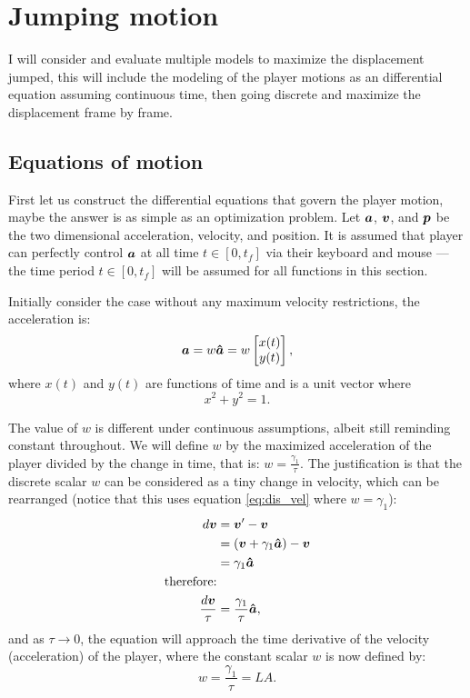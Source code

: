 \section{Jumping motion}
I will consider and evaluate multiple models to maximize the displacement jumped, this will include the modeling of the player motions as an differential equation assuming continuous time, then going discrete and maximize the displacement frame by frame.

\subsection{Equations of motion}
First let us construct the differential equations that govern the player motion, maybe the answer is as simple as an optimization problem. Let $\boldsymbol{a}$, $\boldsymbol{v}$, and $\boldsymbol{p}$ be the two dimensional acceleration, velocity, and position. It is assumed that player can perfectly control $\boldsymbol{a}$ at all time $t \in [0, t_f]$ via their keyboard and mouse --- the time period $t\in[0,t_f]$ will be assumed for all functions in this section.

Initially consider the case without any maximum velocity restrictions, the acceleration is:
\begin{align*}
    \boldsymbol{a} = w\boldsymbol{\hat{a}} = w\begin{bmatrix}x(t)\\y(t) \end{bmatrix},
\end{align*}
where $x(t)$ and $y(t)$ are functions of time and is a unit vector where
\[
x^2 + y^2 = 1.
\]

The value of $w$ is different under continuous assumptions, albeit still reminding constant throughout. We will define $w$ by the maximized acceleration of the player divided by the change in time, that is: $w = \frac{\gamma_1}{\tau}$. The justification is that the discrete scalar $w$ can be considered as a tiny change in velocity, which can be rearranged (notice that this uses equation \ref{eq:dis_vel} where $w=\gamma_1$):
\begin{align*}
    d\boldsymbol{v} &=  \boldsymbol{v}' - \boldsymbol{v}\\
    &= (\boldsymbol{v} + \gamma_1 \boldsymbol{\hat{a}}) - \boldsymbol{v}\\
    &= \gamma_1 \boldsymbol{\hat{a}}\\
    \text{therefore:}&\\
    \frac{d\boldsymbol{v}}{\tau} &= \frac{\gamma_1}{\tau} \boldsymbol{\hat{a}},
\end{align*}
and as $\tau \to 0$, the equation will approach the time derivative of the velocity (acceleration) of the player, where the constant scalar $w$ is now defined by:
\[
w = \frac{\gamma_1}{\tau} = LA.
\]

